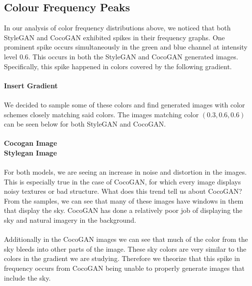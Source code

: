 \documentclass[12pt]{article}
\begin{document}
\begin{multicols*}{2}
        \subsection{Colour Frequency Peaks}
        In our analysis of color frequency distributions above, we noticed that both StyleGAN and CocoGAN exhibited spikes in their frequency graphs.
        One prominent spike occurs simultaneously in the green and blue channel at intensity level 0.6.
        This occurs in both the StyleGAN and CocoGAN generated images.
        Specifically, this spike happened in colors covered by the following gradient.
        \\\\
        \textbf{Insert Gradient}
        \\\\
        We decided to sample some of these colors and find generated images with color schemes closely matching said colors.
        The images matching color $(0.3, 0.6, 0.6)$ can be seen below for both StyleGAN and CocoGAN.
        \\\\
        \textbf{Cocogan Image}\\
        \textbf{Stylegan Image}
        \\\\
        For both models, we are seeing an increase in noise and distortion in the images.
        This is especially true in the case of CocoGAN, for which every image displays noisy textures or bad structure.
        What does this trend tell us about CocoGAN?
        From the samples, we can see that many of these images have windows in them that display the sky.
        CocoGAN has done a relatively poor job of displaying the sky and natural imagery in the background.
        \\\\
        Additionally in the CocoGAN images we can see that much of the color from the sky bleeds into other parts of the image.
        These sky colors are very similar to the colors in the gradient we are studying.
        Therefore we theorize that this spike in frequency occurs from CocoGAN being unable to properly generate images that include the sky.

\end{multicols*}
\end{document}
